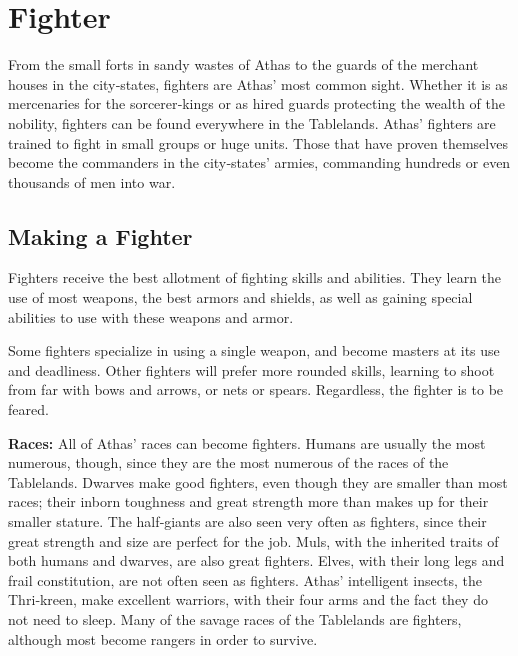 \section{Fighter}

From the small forts in sandy wastes of Athas to the guards of the merchant houses in the city‐states, fighters are Athas' most common sight. Whether it is as mercenaries for the sorcerer‐kings or as hired guards protecting the wealth of the nobility, fighters can be found everywhere in the Tablelands. Athas' fighters are trained to fight in small groups or huge units. Those that have proven themselves become the commanders in the city‐states' armies, commanding hundreds or even thousands of men into war.

\subsection{Making a Fighter}

Fighters receive the best allotment of fighting skills and abilities. They learn the use of most weapons, the best armors and shields, as well as gaining special abilities to use with these weapons and armor.

Some fighters specialize in using a single weapon, and become masters at its use and deadliness. Other fighters will prefer more rounded skills, learning to shoot from far with bows and arrows, or nets or spears. Regardless, the fighter is to be feared.

\textbf{Races:} All of Athas' races can become fighters. Humans are usually the most numerous, though, since they are the most numerous of the races of the Tablelands. Dwarves make good fighters, even though they are smaller than most races; their inborn toughness and great strength more than makes up for their smaller stature. The half‐giants are also seen very often as fighters, since their great strength and size are perfect for the job. Muls, with the inherited traits of both humans and dwarves, are also great fighters. Elves, with their long legs and frail constitution, are not often seen as fighters. Athas' intelligent insects, the Thri‐kreen, make excellent warriors, with their four arms and the fact they do not need to sleep. Many of the savage races of the Tablelands are fighters, although most become rangers in order to survive.

